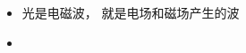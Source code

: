 
\begin{issues}
\issueDraft
\end{issues}

\begin{itemize}
\item 光是电磁波， 就是电场和磁场产生的波
\item 
\end{itemize}

